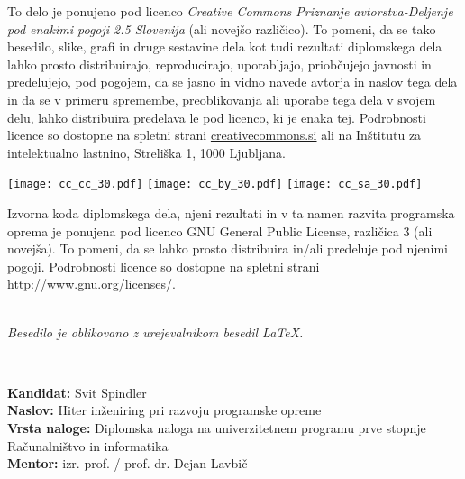 \documentclass[a4paper,12pt,openright]{book}
\newcommand{\clearemptydoublepage}{\newpage{\pagestyle{empty}\cleardoublepage}}
\newcommand{\CcImageCc}[1]{%
	\texttt{[image: cc\_cc\_30.pdf]}%
}
\newcommand{\CcImageBy}[1]{%
	\texttt{[image: cc\_by\_30.pdf]}%
}
\newcommand{\CcImageSa}[1]{%
	\texttt{[image: cc\_sa\_30.pdf]}%
}
\begin{document}
\newpage
\thispagestyle{empty}

\vspace*{5cm}
{\small \noindent
To delo je ponujeno pod licenco \textit{Creative Commons Priznanje avtorstva-Deljenje pod enakimi pogoji 2.5 Slovenija} (ali novej\v so razli\v cico).
To pomeni, da se tako besedilo, slike, grafi in druge sestavine dela kot tudi rezultati diplomskega dela lahko prosto distribuirajo,
reproducirajo, uporabljajo, priobčujejo javnosti in predelujejo, pod pogojem, da se jasno in vidno navede avtorja in naslov tega
dela in da se v primeru spremembe, preoblikovanja ali uporabe tega dela v svojem delu, lahko distribuira predelava le pod
licenco, ki je enaka tej.
Podrobnosti licence so dostopne na spletni strani \href{http://creativecommons.si}{creativecommons.si} ali na Inštitutu za
intelektualno lastnino, Streliška 1, 1000 Ljubljana.

\vspace*{1cm}
\begin{center}%
\CcImageCc{0.741573033707865}\hspace*{1ex}\CcImageBy{1}\hspace*{1ex}\CcImageSa{1}%
\end{center}
}

\vspace*{1cm}
{\small \noindent
Izvorna koda diplomskega dela, njeni rezultati in v ta namen razvita programska oprema je ponujena pod licenco GNU General Public License,
različica 3 (ali novejša). To pomeni, da se lahko prosto distribuira in/ali predeluje pod njenimi pogoji.
Podrobnosti licence so dostopne na spletni strani \url{http://www.gnu.org/licenses/}.
}

\vfill
\begin{center} 
\ \\ \vfill
{\em
Besedilo je oblikovano z urejevalnikom besedil \LaTeX.}
\end{center}

\clearemptydoublepage

\thispagestyle{empty}
\
\vfill

\bigskip
\noindent\textbf{Kandidat:} Svit Spindler\\
\noindent\textbf{Naslov:} Hiter inženiring pri razvoju
programske opreme\\
\noindent\textbf{Vrsta naloge:} Diplomska naloga na univerzitetnem programu prve stopnje Računalništvo in informatika \\
\noindent\textbf{Mentor:} izr. prof. / prof. dr. Dejan Lavbič\\
\end{document}
